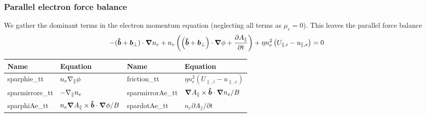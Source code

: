 \subsubsection{Parallel electron force balance}
We gather the dominant terms in the electron momentum equation (neglecting all terms as $\mu_e=0$). This leaves the parallel force balance
\begin{align}
    -(\bm{\hat{b}} + {\boldsymbol{b}}_\perp) \cdot{\boldsymbol{\nabla}} n_e +n_e\left( \left( \bm{\hat{b}} + {\boldsymbol{b}}_\perp \right) \cdot{\boldsymbol{\nabla}} \phi + \frac{\partial A_\parallel}{\partial t} \right) +\eta n_e^2 \left( U_{\parallel,i} - u_{\parallel,e}\right) = 0
\end{align}
\begin{longtable}{llll}
\toprule
\rowcolor{gray!50}\textbf{Name} &  \textbf{Equation} &
\textbf{Name} &  \textbf{Equation}\\
\midrule
    sparphie\_tt & $n_e\nabla_\parallel \phi$ &
    friction\_tt & $ \eta n_e^2(U_{\parallel,i}-u_{\parallel,e})$ \\
    sparmirrore\_tt & $-\nabla_\parallel n_e$ &
    sparmirrorAe\_tt & ${\boldsymbol{\nabla}} A_\parallel \times \bm{\hat{b}} \cdot{\boldsymbol{\nabla}} n_e /B$ \\
    sparphiAe\_tt & $n_e {\boldsymbol{\nabla}} A_\parallel \times \bm{\hat{b}} \cdot{\boldsymbol{\nabla}} \phi /B$ &
    spardotAe\_tt & $ n_e \partial A_\parallel /\partial t$ \\
\bottomrule
\end{longtable}




